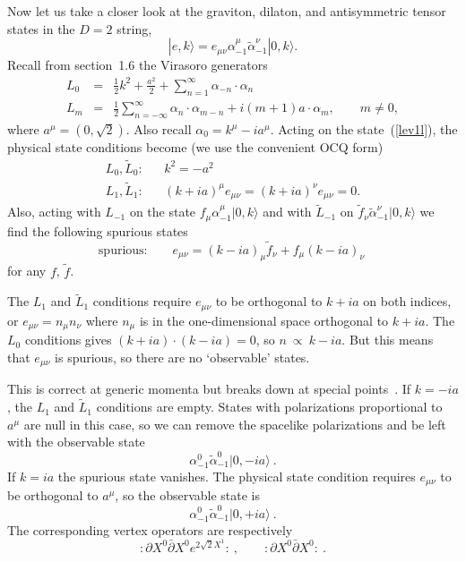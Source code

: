 
Now let us take a closer look at the graviton, dilaton,
and antisymmetric tensor states in the $D=2$ string,
\begin{equation}
|e,k\rangle = e_{\mu\nu} \alpha^\mu_{-1} \tilde\alpha^\nu_{-1}
|0,k\rangle. \label{lev1l}
\end{equation}
Recall from section~1.6 the Virasoro generators
\begin{eqnarray}
L_0 &=& \frac{1}{2} k^2 
+ \frac{a^2}{2} + \sum_{n=1}^\infty \alpha_{-n}
\cdot \alpha_{n}
\nonumber\\
L_m &=& \frac{1}{2} \sum_{n=-\infty}^\infty \alpha_n
\cdot \alpha_{m-n} + i (m+1) a \cdot \alpha_m ,
\qquad m \neq 0,
\end{eqnarray}
where $a^\mu = (0, \sqrt{2})$.  Also recall $\alpha_0 = k^\mu - i
a^\mu$. Acting on the state~(\ref{lev1l}), the physical state
conditions become (we use the convenient OCQ form)
\begin{eqnarray}
L_0, \tilde L_0:&& k^2 = - a^2 \nonumber\\
L_1, \tilde L_1:&&  (k + i a)^\mu e_{\mu\nu} =
(k + i a)^\nu e_{\mu\nu} = 0.
\end{eqnarray}
Also, acting with $L_{-1}$ on the state 
$f_\mu \alpha^\mu_{-1} |0,k\rangle$ and with $\tilde L_{-1}$ on
$\tilde f_\nu \tilde\alpha^\nu_{-1} |0,k\rangle$ we find the following
spurious states
\begin{equation}
\mbox{spurious:}\qquad e_{\mu\nu} = (k - i a)_\mu \tilde f_\nu 
+ f_\mu (k - i a)_\nu\ 
\end{equation}
for any $f$, $\tilde f$.

The $L_1$ and $\tilde L_{1}$ conditions require $e_{\mu\nu}$ to be
orthogonal to $k + ia$ on both indices, or
$e_{\mu\nu} = n_\mu n_\nu$ where $n_\mu$ is in the one-dimensional
space orthogonal to $k + i a$.
The $L_0$ conditions gives $(k + ia) \cdot (k - ia) = 0$,
so $n\ \propto\ k - ia$.  But this means that $e_{\mu\nu}$ is
spurious, so there are no `observable' states.

This is correct at generic momenta but breaks down at special
points~\cite{Plp}. If $k = -ia$, the $L_{1}$ and $\tilde L_{1}$
conditions are empty.  States with polarizations proportional to
$a^\mu$ are null in this case, so we can remove the spacelike
polarizations and be left with the observable state
\begin{equation}
\alpha^0_{-1} \tilde\alpha^0_{-1} |0, - ia \rangle\ .
\end{equation}
If $k = ia$ the spurious state vanishes.  The physical state
condition requires $e_{\mu\nu}$ to be orthogonal to $a^\mu$, so the 
observable state is
\begin{equation}
\alpha^0_{-1} \tilde\alpha^0_{-1} |0, + ia \rangle\ .
\end{equation}
The corresponding vertex operators are respectively
\begin{equation}
:\! \partial X^0 \bar\partial X^0 e^{2\sqrt 2 X^1} \!:\ , \qquad
:\! \partial X^0 \bar\partial X^0  \!:\ .
\end{equation}


